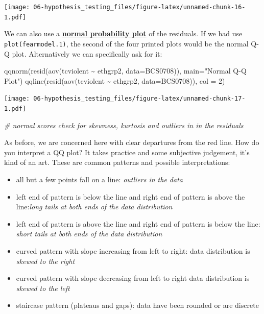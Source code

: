 \documentclass[
]{book}
\newenvironment{Shaded}{\begin{snugshade}}{\end{snugshade}}
\newcommand{\AttributeTok}[1]{\textcolor[rgb]{0.77,0.63,0.00}{#1}}
\newcommand{\CommentTok}[1]{\textcolor[rgb]{0.56,0.35,0.01}{\textit{#1}}}
\newcommand{\DecValTok}[1]{\textcolor[rgb]{0.00,0.00,0.81}{#1}}
\newcommand{\FunctionTok}[1]{\textcolor[rgb]{0.00,0.00,0.00}{#1}}
\newcommand{\NormalTok}[1]{#1}
\newcommand{\SpecialCharTok}[1]{\textcolor[rgb]{0.00,0.00,0.00}{#1}}
\newcommand{\StringTok}[1]{\textcolor[rgb]{0.31,0.60,0.02}{#1}}
\begin{document}
\texttt{[image: 06-hypothesis\_testing\_files/figure-latex/unnamed-chunk-16-1.pdf]}

We can also use a \href{http://en.wikipedia.org/wiki/Normal_probability_plot}{\textbf{normal probability plot}} of the residuals. If we had use \texttt{plot(fearmodel.1)}, the second of the four printed plots would be the normal Q-Q plot. Alternatively we can specifically ask for it:

\begin{Shaded}
\begin{Highlighting}[]
\FunctionTok{qqnorm}\NormalTok{(}\FunctionTok{resid}\NormalTok{(}\FunctionTok{aov}\NormalTok{(tcviolent }\SpecialCharTok{\textasciitilde{}}\NormalTok{ ethgrp2, }\AttributeTok{data=}\NormalTok{BCS0708)), }\AttributeTok{main=}\StringTok{"Normal Q{-}Q Plot"}\NormalTok{)}
\FunctionTok{qqline}\NormalTok{(}\FunctionTok{resid}\NormalTok{(}\FunctionTok{aov}\NormalTok{(tcviolent }\SpecialCharTok{\textasciitilde{}}\NormalTok{ ethgrp2, }\AttributeTok{data=}\NormalTok{BCS0708)), }\AttributeTok{col =} \DecValTok{2}\NormalTok{)}
\end{Highlighting}
\end{Shaded}

\texttt{[image: 06-hypothesis\_testing\_files/figure-latex/unnamed-chunk-17-1.pdf]}

\begin{Shaded}
\begin{Highlighting}[]
\CommentTok{\# normal scores check for skewness, kurtosis and outliers in in the residuals }
\end{Highlighting}
\end{Shaded}

As before, we are concerned here with clear departures from the red line. How do you interpret a QQ plot? It takes practice and some subjective judgement, it's kind of an art. These are common patterns and possible interpretations:

\begin{itemize}
\item
  all but a few points fall on a line: \emph{outliers in the data}
\item
  left end of pattern is below the line and right end of pattern is above the line:\emph{long tails at both ends of the data distribution}
\item
  left end of pattern is above the line and right end of pattern is below the line: \emph{short tails at both ends of the data distribution}
\item
  curved pattern with slope increasing from left to right: data distribution is \emph{skewed to the right}
\item
  curved pattern with slope decreasing from left to right data distribution is \emph{skewed to the left}
\item
  staircase pattern (plateaus and gaps): data have been rounded or are discrete
\end{itemize}
\end{document}
